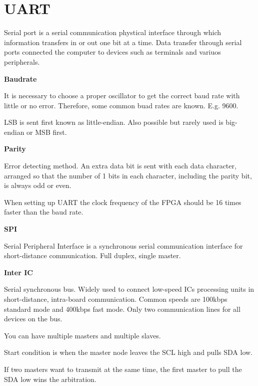 \section{UART}

Serial port is a serial communication phystical interface
through which information transfers in or out one bit at a time.
Data transfer through serial ports connected the computer
to devices such as terminals and variuos peripherals.

\textbf{Baudrate}

It is necessary to choose a proper oscillator to get the
correct baud rate with little or no error. Therefore, some common buad
rates are known. E.g. 9600.

LSB is sent first known as little-endian. Also possible but
rarely used is big-endian or MSB first.

\textbf{Parity}

Error detecting method. An extra data bit is sent with each data
character, arranged so that the number of 1 bits in each character,
including the parity bit, is always odd or even.

When setting up UART the clock frequency of the FPGA should be 16 times faster
than the baud rate.


\textbf{SPI}

Serial Peripheral Interface is a synchronous serial communication interface
for short-distance communication.
Full duplex, single master.



\textbf{Inter IC}

Serial synchronous bus. Widely used to connect low-speed ICs processing
units in short-distance, intra-board communication.
Common speeds are 100kbps standard mode and 400kbps fast mode.
Only two communication lines for all devices on the bus.

You can have multiple masters and multiple slaves.

Start condition is when the master node leaves the SCL high and
pulls SDA low.

If two masters want to transmit at the same time, the
first master to pull the SDA low wins the arbitration.


